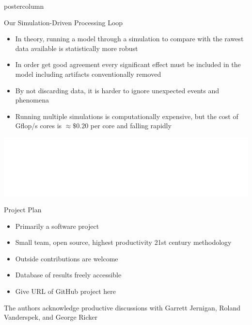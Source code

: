 \documentclass[final,hyperref={pdfpagelabels=false}]{beamer}
\begin{document}
\begin{frame}
\begin{columns}
\begin{column}{.49\textwidth}
\begin{beamercolorbox}[center,wd=\textwidth]{postercolumn}
\begin{minipage}[T]{.95\textwidth}
{            \vspace{2cm}
            \begin{block}{Our Simulation-Driven Processing Loop}
            \begin{itemize}
            \item  In theory, running a model through a simulation to compare with the rawest data available is statistically more robust
            \item In order get good agreement every significant effect must be included in the model including artifacts conventionally removed
            \item By not discarding data, it is harder to ignore unexpected events and phenomena
            \item Running multiple simulations is computationally expensive, but the cost of Gflop/s cores is $\approx\$0.20$ per core and falling rapidly
            \end{itemize}
              \begin{center}
              \includegraphics[width=0.75\linewidth]{figures/Our_Pipeline.pdf}
              \end{center}
            \end{block}
            \begin{block}{Project Plan}
            \begin{itemize}
		\item Primarily a software project
		\item Small team, open source, highest productivity 21st century methodology
		\item Outside contributions are welcome
		\item Database of results freely accessible
		\item Give URL of GitHub project here
	    \end{itemize}
	    \vspace{1cm}
The authors acknowledge productive discussions with Garrett Jernigan, Roland Vanderspek, and George Ricker
            \end{block}
          }
        \end{minipage}
      \end{beamercolorbox}
    \end{column}


\end{columns}
\end{frame}
\end{document}
